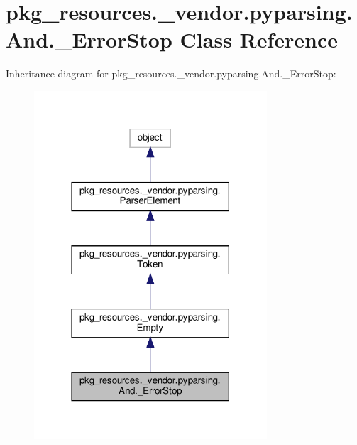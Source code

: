 \hypertarget{classpkg__resources_1_1__vendor_1_1pyparsing_1_1And_1_1__ErrorStop}{}\section{pkg\+\_\+resources.\+\_\+vendor.\+pyparsing.\+And.\+\_\+\+Error\+Stop Class Reference}
\label{classpkg__resources_1_1__vendor_1_1pyparsing_1_1And_1_1__ErrorStop}


Inheritance diagram for pkg\+\_\+resources.\+\_\+vendor.\+pyparsing.\+And.\+\_\+\+Error\+Stop\+:
\nopagebreak
\begin{figure}[H]
\begin{center}
\leavevmode
\includegraphics[width=246pt]{classpkg__resources_1_1__vendor_1_1pyparsing_1_1And_1_1__ErrorStop__inherit__graph}
\end{center}
\end{figure}


